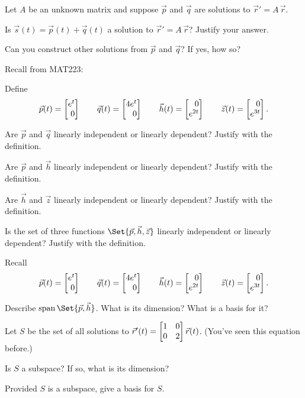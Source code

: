 \documentclass{workbook}
\begin{document}
\begin{slide}
	\question
	Let $A$ be an unknown matrix and suppose $\vec p$ and $\vec q$ are solutions to $\vec r'=A\,\vec r$.

	\begin{parts}
		\item Is $\vec s(t)=\vec p(t)+\vec q(t)$ a solution to $\vec r'=A\,\vec r$? Justify your answer.
		\item Can you construct other solutions from $\vec p$ and $\vec q$? If yes, how so?
	\end{parts}
\end{slide}

\begin{slide}
	\question
	Recall from MAT223:

	Define
	\[
		\vec p(t) = \mat{e^t\\0}\qquad
		\vec q(t) = \mat{4e^t\\0}\qquad
		\vec h(t) = \mat{0\\ e^{2t}}\qquad
		\vec z(t) = \mat{0\\ e^{3t}}.
	\]


	\begin{parts}
		\item Are $\vec p$ and $\vec q$ linearly independent or linearly dependent? Justify with the definition.
		\item Are $\vec p$ and $\vec h$ linearly independent or linearly dependent? Justify with the definition.
		\item Are $\vec h$ and $\vec z$ linearly independent or linearly dependent? Justify with the definition.
		\item Is the set of three functions  $\Set{\vec p,\vec h,\vec z}$ linearly independent or linearly dependent? Justify with the definition.
	\end{parts}
\end{slide}

\begin{slide}
	\question
	Recall
	\[
		\vec p(t) = \mat{e^t\\0}\qquad
		\vec q(t) = \mat{4e^t\\0}\qquad
		\vec h(t) = \mat{0\\ e^{2t}}\qquad
		\vec z(t) = \mat{0\\ e^{3t}}.
	\]


	\begin{parts}
		\item Describe $\Span\Set{\vec p, \vec h}$. What is its dimension? What is a basis for it?
		\item Let $S$ be the set of all solutions to $\vec r'(t) = \mat{1&0\\0&2}\vec r(t)$. {
		\small(You've seen this equation before.)}

		Is $S$ a subspace? If so, what is its dimension?
		\item Provided $S$ is a subspace, give a basis for $S$.
	\end{parts}
\end{slide}
\end{document}
